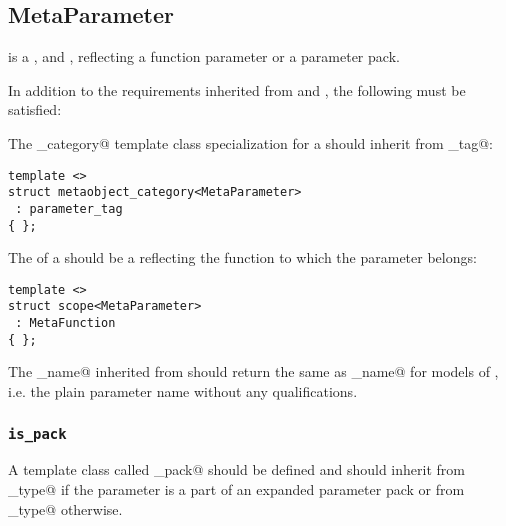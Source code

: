 \subsection{MetaParameter}
\label{concept-MetaParameter}


 is a ,  and ,
reflecting a function parameter or a parameter pack.

In addition to the requirements inherited from  and ,
the following must be satisfied:

The \verb@metaobject_category@ template class specialization for a  should
inherit from \verb@parameter_tag@:

\begin{verbatim}
template <>
struct metaobject_category<MetaParameter>
 : parameter_tag
{ };
\end{verbatim}

The \verb@scope@ of a  should be a  reflecting
the function to which the parameter belongs:

\begin{verbatim}
template <>
struct scope<MetaParameter>
 : MetaFunction
{ };
\end{verbatim}

The \verb@full_name@ inherited from  should return the same 
as \verb@base_name@ for models of , i.e. the plain parameter
name without any qualifications.

\subsubsection{\texttt{is\_pack}}

A template class called \verb@is_pack@ should be defined and should
inherit from \verb@true_type@ if the parameter is a part of an expanded
parameter pack or from \verb@false_type@ otherwise.

